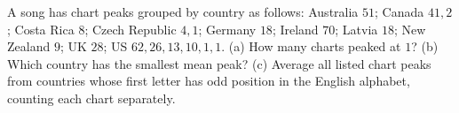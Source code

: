 A song has chart peaks grouped by country as follows: Australia $51$; Canada $41,2$; Costa Rica $8$; Czech Republic $4,1$; Germany $18$; Ireland $70$; Latvia $18$; New Zealand $9$; UK $28$; US $62,26,13,10,1,1$. (a) How many charts peaked at $1$? (b) Which country has the smallest mean peak? (c) Average all listed chart peaks from countries whose first letter has odd position in the English alphabet, counting each chart separately.
